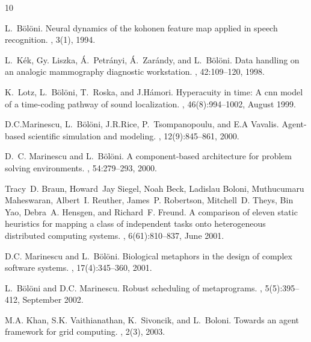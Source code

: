 \begin{thebibliography}{10}

L.~B{\"o}l{\"o}ni.
\newblock Neural dynamics of the kohonen feature map applied in speech
  recognition.
, 3(1),
  1994.

L.~K{\'e}k, Gy. Liszka, {\'A}.~Petr{\'a}nyi, {\'A}.~Zar{\'a}ndy, and
  L.~B{\"o}l{\"o}ni.
\newblock Data handling on an analogic mammography diagnostic workstation.
, 42:109--120, 1998.

K.~Lotz, L.~B{\"o}l{\"o}ni, T.~Roska, and J.H{\'a}mori.
\newblock Hyperacuity in time: A cnn model of a time-coding pathway of sound
  localization.
, 46(8):994--1002,
  August 1999.

D.C.Marinescu, L.~B{\"o}l{\"o}ni, J.R.Rice, P.~Tsompanopoulu, and E.A Vavalis.
\newblock Agent-based scientific simulation and modeling.
, 12(9):845--861, 2000.

D.~C. Marinescu and L.~B{\"o}l{\"o}ni.
\newblock A component-based architecture for problem solving environments.
, 54:279--293, 2000.

Tracy~D. Braun, Howard~Jay Siegel, Noah Beck, Ladislau Boloni, Muthucumaru
  Maheswaran, Albert~I. Reuther, James~P. Robertson, Mitchell~D. Theys, Bin
  Yao, Debra~A. Hensgen, and Richard~F. Freund.
\newblock A comparison of eleven static heuristics for mapping a class of
  independent tasks onto heterogeneous distributed computing systems.
, 6(61):810--837,
  June 2001.

D.C. Marinescu and L.~B{\"o}l{\"o}ni.
\newblock Biological metaphors in the design of complex software systems.
, 17(4):345--360,
  2001.

L.~B{\"o}l{\"o}ni and D.C. Marinescu.
\newblock Robust scheduling of metaprograms.
, 5(5):395--412, September 2002.

M.A. Khan, S.K. Vaithianathan, K.~Sivoncik, and L.~Boloni.
\newblock Towards an agent framework for grid computing.
, 2(3), 2003.


\end{thebibliography}
